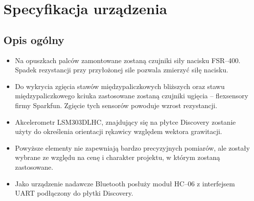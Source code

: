 \documentclass[12pt,a4paper]{article}
\begin{document}
\section{Specyfikacja urządzenia}

\subsection{Opis ogólny}
\begin{itemize}
\item Na opuszkach palców zamontowane zostaną czujniki siły nacisku FSR--400. Spadek rezystancji przy przyłożonej sile pozwala zmierzyć siłę nacisku.
\item Do wykrycia zgięcia stawów międzypaliczkowych bliższych oraz stawu międzypaliczkowego kciuka zastosowane zostaną czujniki ugięcia -- flexsensory firmy Sparkfun. Zgięcie tych sensorów powoduje wzrost rezystancji.
\item Akcelerometr LSM303DLHC, znajdujący się na płytce Discovery zostanie użyty do określenia orientacji rękawicy względem wektora grawitacji.
\item Powyższe elementy nie zapewniają bardzo precyzyjnych pomiarów, ale zostały wybrane ze względu na cenę i charakter projektu, w którym zostaną zastosowane.
\item Jako urządzenie nadawcze Bluetooth posłuży moduł HC--06 z interfejsem UART podłączony do płytki Discovery.
\end{itemize}

\newpage
\end{document}
